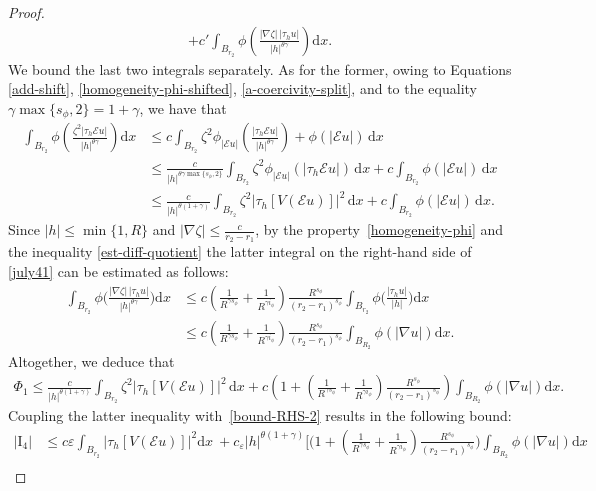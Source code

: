 \documentclass[leqno,11pt]{amsart}%
\numberwithin{equation}{section}
\newcommand{\eps}{\varepsilon}
\def\d{\mathrm{d}}
\def\E{\mathcal{E}}
\def\dx{\d x}
\theoremstyle{definition}
\numberwithin{equation}{section}
\begin{document}
\begin{proof}
\begin{align}
  +
  c' \int_{B_{r_2}}\phi\left(\frac{|\nabla\zeta|\,|\tau_hu|}{|h|^{ {\theta\gamma}}}\right)\dx.
\end{align}
We bound the last two integrals separately. As for the former,
owing to Equations \eqref{add-shift}, \eqref{homogeneity-phi-shifted},  \eqref{a-coercivity-split}, and to the equality ${ {\gamma}}\max\{{s_\phi},2\}= {1+\gamma}$, we have that
\begin{align*}
  \int_{B_{r_2}}\phi\left(\frac{\zeta^2|\tau_h{\E u}|}{|h|^{ {\theta\gamma}}}\right)
    \dx
    &
\le
c\int_{B_{r_2}}\zeta^2\phi_{|{\E u}|}\left(\frac{|\tau_h{\E u}|}{|h|^{ {\theta\gamma}}}\right)+\phi(|{\E u}|) \,\dx\nonumber\\
  & \le
    \frac{c}{|h|^{{ {\theta\gamma}}\max\{{s_\phi},2\}}}\int_{B_{r_2}}\zeta^2\phi_{|{\E u}|}(|\tau_h{\E u}|)\,\dx
    +
    c\int_{B_{r_2}}\phi(|{\E u}|) \,\dx\nonumber\\
  & \le
    \frac{c}{|h|^{ {\theta(1+\gamma)}}}\int_{B_{r_2}}\zeta^2|\tau_h[V({\E u})]|^2\,\dx
   +
   c\int_{B_{r_2}}\phi(|{\E u}|) \,\dx.
\end{align*}
Since $|h|\le  \min\{1,R\}$ and $|\nabla\zeta|\le\frac c{r_2-r_1}$, by
the property~\eqref{homogeneity-phi} and the inequality \eqref{est-diff-quotient} the latter integral on the right-hand side of \eqref{july41} can be estimated as follows:
\begin{align}\label{july50}
  \int_{B_{r_2}}  \phi\Big(\frac{|\nabla\zeta|\,|\tau_hu|}{|h|^{ {\theta\gamma}}}\Big)\dx
  &\le
   c{\left(\frac{1}{R^{\gamma s_\phi}}+\frac{1}{R^{\gamma i_\phi}}\right)\frac{R^{s_\phi}}{(r_2-r_1)^{s_\phi}}}\int_{B_{r_2}}  \phi\Big(\frac{|\tau_hu|}{|h|}\Big)\dx \\\nonumber
  &\le
  {c\left(\frac{1}{R^{\gamma s_\phi}}+\frac{1}{R^{\gamma i_\phi}}\right)\frac{R^{s_\phi}}{(r_2-r_1)^{s_\phi}}}\int_{B_{R_2}} \phi(|\nabla u|)\dx.
\end{align} 
Altogether, we deduce that
\begin{align*}
  \Phi_1
  \le
  \frac{c}{|h|^{{\theta(1+\gamma)}}}\int_{B_{{r_2}}}\zeta^2|\tau_h[V(\E u)]|^2\,\dx
   +
c\left( {1+}\left(\frac{1}{R^{\gamma s_\phi}}+\frac{1}{R^{\gamma i_\phi}}\right)\frac{R^{s_\phi}}{(r_2-r_1)^{s_\phi}}\right)\int_{B_{R_2}} \phi(|\nabla u|)\dx.
\end{align*}
Coupling the latter inequality with~\eqref{bound-RHS-2} results in the following bound:
\begin{align}\label{est-I4}
 |\mathrm{I}_4|& \le
   c\eps\int_{B_{r_2}} |\tau_h[V(\E u)]|^2\dx\
  + c_\eps
     |h|^{ {\theta(1+\gamma)}}\Bigg[\bigg( {1+ }{\left(\frac{1}{R^{\gamma s_\phi}}+\frac{1}{R^{\gamma i_\phi}}\right)\frac{R^{s_\phi}}{(r_2-r_1)^{s_\phi}}} \bigg)\int_{B_{R_2}} \phi(|\nabla u|)\dx\\\nonumber

\end{align}
\end{proof}
\end{document}

